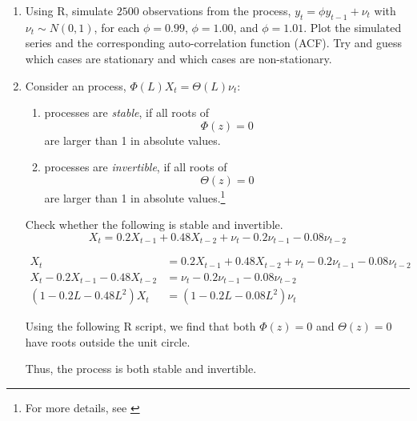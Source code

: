 \begin{enumerate}
    \item Using R, simulate $2500$ observations from the \arp[1]{} process, $y_t = \phi y_{t-1} + \nu_t$ with $\nu_t \sim N(0, 1)$, for each $\phi = 0.99$, $\phi = 1.00$, and $\phi = 1.01$. Plot the simulated series and the corresponding auto-correlation function (ACF). Try and guess which cases are stationary and which cases are non-stationary. 

    \begin{sol}
        
    \end{sol}

    \item Consider an \armapq{} process, $\Phi(L) X_t = \Theta(L) \nu_t$:
        \begin{enumerate}[label=$\bullet$]
        \item \armapq{} processes are \emph{stable}, if all roots of 
        \[ \Phi(z) = 0 \]
        are larger than 1 in absolute values.

        \item \armapq{} processes are \emph{invertible}, if all roots of 
        \[ \Theta(z) = 0 \]
        are larger than 1 in absolute values.\footnote{For more details, see \cite[][Chapter 3, "Stationary ARMA Processes"]{Hamilton-1994}}
        \end{enumerate}

        Check whether the following \armapq[2, 2]{} is stable and invertible.
        \[
            X_t
            = 0.2 X_{t-1} + 0.48 X_{t-2}
            + \nu_t - 0.2 \nu_{t-1} - 0.08 \nu_{t-2}
        \]

        \begin{sol}
            \begin{align*}
                X_t
                & = 0.2 X_{t-1} + 0.48 X_{t-2}
                + \nu_t - 0.2 \nu_{t-1} - 0.08 \nu_{t-2}
                \\
                X_t - 0.2 X_{t-1} - 0.48 X_{t-2} 
                & = \nu_t - 0.2 \nu_{t-1} - 0.08 \nu_{t-2}
                \\
                (1 - 0.2 L - 0.48 L^2) X_t 
                & = (1 - 0.2 L - 0.08 L^2) \nu_t
            \end{align*}

            Using the following R script, we find that both $\Phi(z) = 0$ and $\Theta(z) = 0$ have roots outside the unit circle.
            
            Thus, the process is both stable and invertible.
        \end{sol}
\end{enumerate}